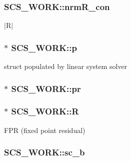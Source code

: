 \hypertarget{struct_s_c_s___w_o_r_k_a181c42e5bc2993d210af0e8583ebc619}{
\subsubsection[{nrm\-R\-\_\-con}]{ S\-C\-S\-\_\-\-W\-O\-R\-K\-::nrm\-R\-\_\-con}}\label{struct_s_c_s___w_o_r_k_a181c42e5bc2993d210af0e8583ebc619}
$|$R$|$ \hypertarget{struct_s_c_s___w_o_r_k_a2421f797d8a128d6a0261be319a5f5db}{
\subsubsection[{p}]{$\ast$ S\-C\-S\-\_\-\-W\-O\-R\-K\-::p}}\label{struct_s_c_s___w_o_r_k_a2421f797d8a128d6a0261be319a5f5db}
struct populated by linear system solver \hypertarget{struct_s_c_s___w_o_r_k_a84cf8506c84d35cb16f7e61bc069d397}{
\subsubsection[{pr}]{$\ast$ S\-C\-S\-\_\-\-W\-O\-R\-K\-::pr}}\label{struct_s_c_s___w_o_r_k_a84cf8506c84d35cb16f7e61bc069d397}
\hypertarget{struct_s_c_s___w_o_r_k_a599d46f1e9537cbf96bc6f1cf671ffc7}{
\subsubsection[{R}]{$\ast$ S\-C\-S\-\_\-\-W\-O\-R\-K\-::\-R}}\label{struct_s_c_s___w_o_r_k_a599d46f1e9537cbf96bc6f1cf671ffc7}
F\-P\-R (fixed point residual) \hypertarget{struct_s_c_s___w_o_r_k_a00e156d74af3a51c8225907fed29a4a3}{
\subsubsection[{sc\-\_\-b}]{ S\-C\-S\-\_\-\-W\-O\-R\-K\-::sc\-\_\-b}}\label{struct_s_c_s___w_o_r_k_a00e156d74af3a51c8225907fed29a4a3}
